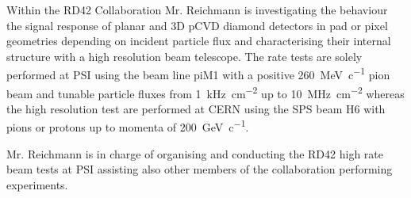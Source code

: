 
Within the RD42 Collaboration Mr. Reichmann is investigating the behaviour the signal response of planar and 3D \ac{pCVD} diamond detectors in pad or pixel geometries depending on incident particle flux and characterising their internal structure with a high resolution beam telescope. The rate tests are solely performed at \ac{PSI} using the beam line piM1 with a positive \SI{260}{\mega\electronvolt\per c} pion beam and tunable particle fluxes from \SI{1}{\kilo\hertz\per\centi\meter^2} up to \SI{10}{\mega\hertz\per\centi\meter^2} whereas the high resolution test are performed at CERN using the SPS beam H6 with pions or protons up to momenta of \SI{200}{\giga\electronvolt\per c}.\par
Mr. Reichmann is in charge of organising and conducting the RD42 high rate beam tests at \ac{PSI} assisting also other members of the collaboration performing experiments.
	
